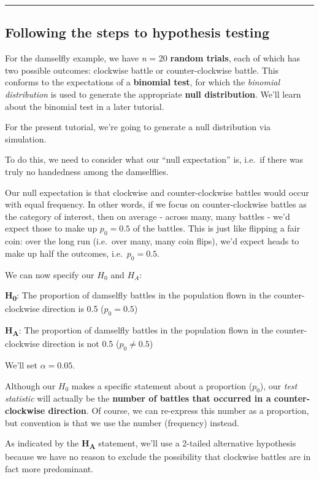 \documentclass[
]{book}
\begin{document}
\begin{center}\rule{0.5\linewidth}{0.5pt}\end{center}

\subsection{Following the steps to hypothesis testing}\label{follow_hyp_steps}

For the damselfly example, we have \emph{n} = 20 \textbf{random trials}, each of which has two possible outcomes: clockwise battle or counter-clockwise battle. This conforms to the expectations of a \textbf{binomial test}, for which the \emph{binomial distribution} is used to generate the appropriate \textbf{null distribution}. We'll learn about the binomial test in a later tutorial.

For the present tutorial, we're going to generate a null distribution via simulation.

To do this, we need to consider what our ``null expectation'' is, i.e.~if there was truly no handedness among the damselflies.

Our null expectation is that clockwise and counter-clockwise battles would occur with equal frequency. In other words, if we focus on counter-clockwise battles as the category of interest, then on average - across many, many battles - we'd expect those to make up \(p_0 = 0.5\) of the battles. This is just like flipping a fair coin: over the long run (i.e.~over many, many coin flips), we'd expect heads to make up half the outcomes, i.e.~\(p_0 = 0.5\).

We can now specify our \(H_0\) and \(H_A\):

\textbf{H\textsubscript{0}}: The proportion of damselfly battles in the population flown in the counter-clockwise direction is 0.5 (\(p_0 = 0.5\))

\textbf{H\textsubscript{A}}: The proportion of damselfly battles in the population flown in the counter-clockwise direction is not 0.5 (\(p_0 \ne 0.5\))

We'll set \(\alpha = 0.05\).

Although our \(H_0\) makes a specific statement about a proportion (\(p_0\)), our \emph{test statistic} will actually be the \textbf{number of battles that occurred in a counter-clockwise direction}. Of course, we can re-express this number as a proportion, but convention is that we use the number (frequency) instead.

As indicated by the \textbf{H\textsubscript{A}} statement, we'll use a 2-tailed alternative hypothesis because we have no reason to exclude the possibility that clockwise battles are in fact more predominant.
\end{document}
